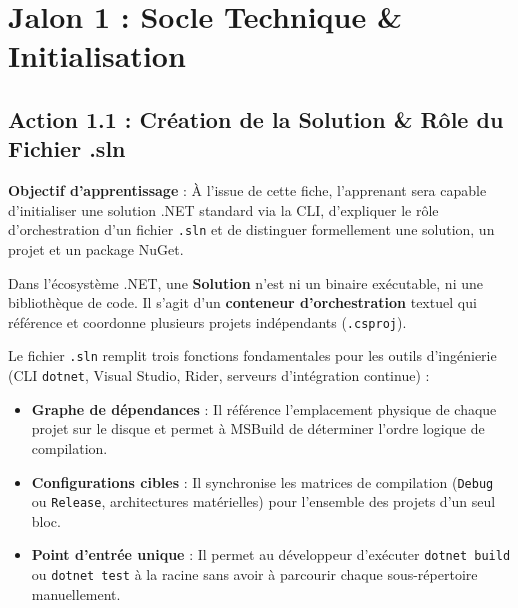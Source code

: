 \chapter{Jalon 1 : Socle Technique \& Initialisation}

\section{Action 1.1 : Création de la Solution \& Rôle du Fichier .sln}

\begin{tcolorbox}[colback=indigo!4!white,colframe=indigo!40!white,arc=2mm,boxrule=0.8pt,top=2mm,bottom=2mm,left=3mm,right=3mm]
    \small\textbf{\color{indigo!90!black}Objectif d'apprentissage} : À l'issue de cette fiche, l'apprenant sera capable d'initialiser une solution .NET standard via la CLI, d'expliquer le rôle d'orchestration d'un fichier \texttt{.sln} et de distinguer formellement une solution, un projet et un package NuGet.
\end{tcolorbox}

\vspace{0.1cm}

Dans l'écosystème .NET, une \textbf{Solution} n'est ni un binaire exécutable, ni une bibliothèque de code. Il s'agit d'un \textbf{conteneur d'orchestration} textuel qui référence et coordonne plusieurs projets indépendants (\texttt{.csproj}).

Le fichier \texttt{.sln} remplit trois fonctions fondamentales pour les outils d'ingénierie (CLI \texttt{dotnet}, Visual Studio, Rider, serveurs d'intégration continue) :
\begin{itemize}
    \item \textbf{Graphe de dépendances} : Il référence l'emplacement physique de chaque projet sur le disque et permet à MSBuild de déterminer l'ordre logique de compilation.
    \item \textbf{Configurations cibles} : Il synchronise les matrices de compilation (\texttt{Debug} ou \texttt{Release}, architectures matérielles) pour l'ensemble des projets d'un seul bloc.
    \item \textbf{Point d'entrée unique} : Il permet au développeur d'exécuter \texttt{dotnet build} ou \texttt{dotnet test} à la racine sans avoir à parcourir chaque sous-répertoire manuellement.
\end{itemize}

\vspace{0.3cm}


